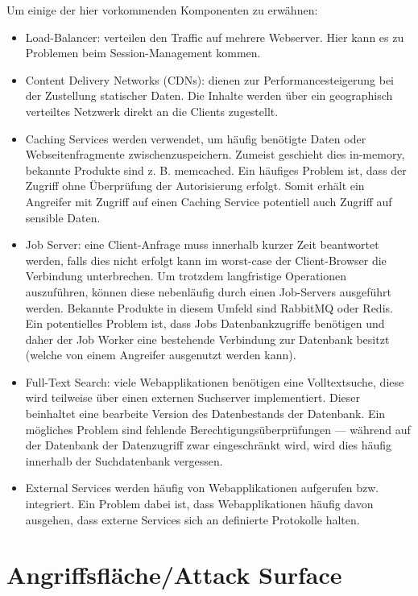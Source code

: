 Um einige der hier vorkommenden Komponenten zu erwähnen:

\begin{itemize}
	\item Load-Balancer: verteilen den Traffic auf mehrere Webserver. Hier kann es zu Problemen beim Session-Management kommen.
	\item Content Delivery Networks (CDNs): dienen zur Performancesteigerung bei der Zustellung statischer Daten. Die Inhalte werden über ein geographisch verteiltes Netzwerk direkt an die Clients zugestellt.
	\item Caching Services werden verwendet, um häufig benötigte Daten oder Webseitenfragmente zwischenzuspeichern. Zumeist geschieht dies in-memory, bekannte Produkte sind z. B. memcached. Ein häufiges Problem ist, dass der Zugriff ohne Überprüfung der Autorisierung erfolgt. Somit erhält ein Angreifer mit Zugriff auf einen Caching Service potentiell auch Zugriff auf sensible Daten.
	\item Job Server: eine Client-Anfrage muss innerhalb kurzer Zeit beantwortet werden, falls dies nicht erfolgt kann im worst-case der Client-Browser die Verbindung unterbrechen. Um trotzdem langfristige Operationen auszuführen, können diese nebenläufig durch einen Job-Servers ausgeführt werden. Bekannte Produkte in diesem Umfeld sind RabbitMQ oder Redis. Ein potentielles Problem ist, dass Jobs Datenbankzugriffe benötigen und daher der Job Worker eine bestehende Verbindung zur Datenbank besitzt (welche von einem Angreifer ausgenutzt werden kann).
	\item Full-Text Search: viele Webapplikationen benötigen eine Volltextsuche, diese wird teilweise über einen externen Suchserver implementiert. Dieser beinhaltet eine bearbeite Version des Datenbestands der Datenbank. Ein mögliches Problem sind fehlende Berechtigungsüberprüfungen --- während auf der Datenbank der Datenzugriff zwar eingeschränkt wird, wird dies häufig innerhalb der Suchdatenbank vergessen.
	\item External Services werden häufig von Webapplikationen aufgerufen bzw. integriert. Ein Problem dabei ist, dass Webapplikationen häufig davon ausgehen, dass externe Services sich an definierte Protokolle halten.
\end{itemize}

\section{Angriffsfläche/Attack Surface}

